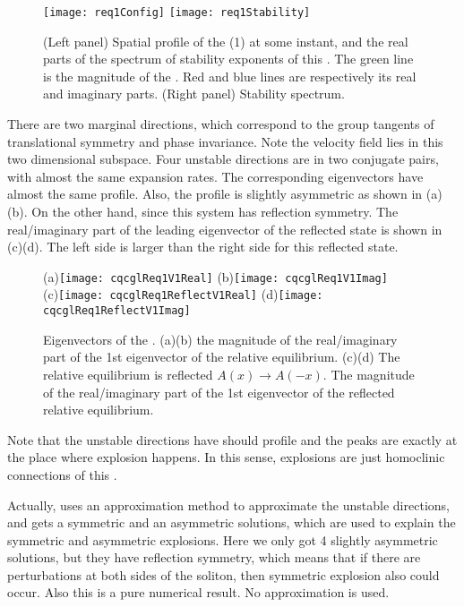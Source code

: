 \begin{figure}[h]
  \centering
  \texttt{[image: req1Config]} \hfill
  \texttt{[image: req1Stability]}
  \caption{(Left panel) Spatial profile of the {\reqv} (1) at some
  instant, and the real parts of the spectrum of stability exponents of
  this {\reqv}. The green line is the magnitude of the {\reqv}. Red and
  blue lines are respectively its real and imaginary parts.
  (Right panel) Stability spectrum.
  }
  \label{fig:req1Config}
\end{figure}

There are two marginal directions, which correspond to the group tangents
of translational symmetry and phase invariance. Note the velocity field
lies in this two dimensional subspace.
Four unstable directions are in two conjugate pairs, with almost
the same expansion rates. The corresponding eigenvectors have
almost the same profile.
Also, the profile is slightly asymmetric
as shown in (a)(b).
On the other hand, since
this system has reflection symmetry. The real/imaginary part of the
leading eigenvector of the reflected state is shown in
(c)(d). The left side is larger than
the right side for this reflected state.
\begin{figure}[h]
  \centering
  (a)\texttt{[image: cqcglReq1V1Real]}
  (b)\texttt{[image: cqcglReq1V1Imag]} \\
  (c)\texttt{[image: cqcglReq1ReflectV1Real]}
  (d)\texttt{[image: cqcglReq1ReflectV1Imag]}
  \caption{
    Eigenvectors of the {\reqv}.
    (a)(b) the magnitude of the real/imaginary part of the 1st
    eigenvector of the relative equilibrium.
    (c)(d) The relative equilibrium is reflected $A(x)\to A(-x)$.
    The magnitude of the real/imaginary part of the 1st
    eigenvector of the reflected relative equilibrium.
  }
  \label{fig:req1eigenvectors}
\end{figure}
Note that the unstable directions have should profile and the
peaks are exactly at the place where explosion
happens. In this sense, explosions are just homoclinic connections of
this {\reqv}.

Actually,  uses an approximation method to
approximate the unstable directions, and gets a symmetric and an asymmetric
solutions, which are used to explain the symmetric and asymmetric
explosions. Here we only got 4 slightly asymmetric solutions, but they have
reflection symmetry, which means that if there are perturbations at both
sides of the soliton, then symmetric explosion also could occur. Also
this is a pure numerical result. No approximation is used.

